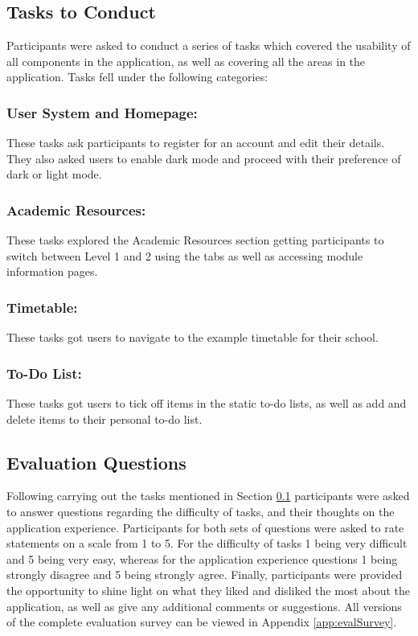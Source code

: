 \documentclass{l4proj}
\begin{document}
\subsection{Tasks to Conduct} \label{tasks}
Participants were asked to conduct a series of tasks which covered the usability of all components in the application,  as well as covering all the areas in the application. Tasks fell under the following categories:

\subsubsection{User System and Homepage:} 
These tasks ask participants to register for an account and edit their details. They also asked users to enable dark mode and proceed with their preference of dark or light mode.

\subsubsection{Academic Resources:}
These tasks explored the Academic Resources section getting participants to switch between Level 1 and 2 using the tabs as well as accessing module information pages.

\subsubsection{Timetable:}
These tasks got users to navigate to the example timetable for their school.

\subsubsection{To-Do List:}
These tasks got users to tick off items in the static to-do lists,  as well as add and delete items to their personal to-do list.

\subsection{Evaluation Questions}
Following carrying out the tasks mentioned in Section \ref{tasks} participants were asked to answer questions regarding the difficulty of tasks,  and their thoughts on the application experience. Participants for both sets of questions were asked to rate statements on a scale from 1 to 5. For the difficulty of tasks 1 being very difficult and 5 being very easy,  whereas for the application experience questions 1 being strongly disagree and 5 being strongly agree. Finally,  participants were provided the opportunity to shine light on what they liked and disliked the most about the application,  as well as give any additional comments or suggestions. All versions of the complete evaluation survey can be viewed in Appendix \ref{app:evalSurvey}.
\end{document}
